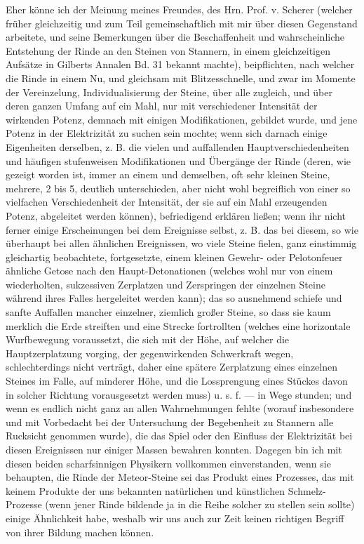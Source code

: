\documentclass[a4paper, 11pt, oneside, german]{article}
\begin{document}
{Eher könne ich der Meinung meines Freundes, des Hrn. Prof. v. Scherer (welcher früher gleichzeitig und zum Teil gemeinschaftlich mit mir über diesen Gegenstand arbeitete, und seine Bemerkungen über die Beschaffenheit und wahrscheinliche Entstehung der Rinde an den Steinen von Stannern, in einem gleichzeitigen Aufsätze in Gilberts Annalen Bd. 31 bekannt machte), beipflichten, nach welcher die Rinde in einem Nu, und gleichsam mit Blitzesschnelle, und zwar im Momente der Vereinzelung, Individualisierung der Steine, über alle zugleich, und über deren ganzen Umfang auf ein Mahl, nur mit verschiedener Intensität der wirkenden Potenz, demnach mit einigen Modifikationen, gebildet wurde, und jene Potenz in der Elektrizität zu suchen sein mochte; wenn sich darnach einige Eigenheiten derselben, z. B. die vielen und auffallenden Hauptverschiedenheiten und häufigen stufenweisen Modifikationen und Übergänge der Rinde (deren, wie gezeigt worden ist, immer an einem und demselben, oft sehr kleinen Steine, mehrere, 2 bis 5, deutlich unterschieden, aber nicht wohl begreiflich von einer so vielfachen Verschiedenheit der Intensität, der sie auf ein Mahl erzeugenden Potenz, abgeleitet werden können), befriedigend erklären ließen; wenn ihr nicht ferner einige Erscheinungen bei dem Ereignisse selbst, z. B. das bei diesem, so wie überhaupt bei allen ähnlichen Ereignissen, wo viele Steine fielen, ganz einstimmig gleichartig beobachtete, fortgesetzte, einem kleinen Gewehr- oder Pelotonfeuer ähnliche Getose nach den Haupt-Detonationen (welches wohl nur von einem wiederholten, sukzessiven Zerplatzen und Zerspringen der einzelnen Steine während ihres Falles hergeleitet werden kann); das so ausnehmend schiefe und sanfte Auffallen mancher einzelner, ziemlich großer Steine, so dass sie kaum merklich die Erde streiften und eine Strecke fortrollten (welches eine horizontale Wurfbewegung voraussetzt, die sich mit der Höhe, auf welcher die Hauptzerplatzung vorging, der gegenwirkenden Schwerkraft wegen, schlechterdings nicht verträgt, daher eine spätere Zerplatzung eines einzelnen Steines im Falle, auf minderer Höhe, und die Lossprengung eines Stückes davon in solcher Richtung vorausgesetzt werden muss) u. s. f. --- in Wege stunden; und wenn es endlich nicht ganz an allen Wahrnehmungen fehlte (worauf insbesondere und mit Vorbedacht bei der Untersuchung der Begebenheit zu Stannern alle Rucksicht genommen wurde), die das Spiel oder den Einfluss der Elektrizität bei diesen Ereignissen nur einiger Massen bewahren konnten. Dagegen bin ich mit diesen beiden scharfsinnigen Physikern vollkommen einverstanden, wenn sie behaupten, die Rinde der Meteor-Steine sei das Produkt eines Prozesses, das mit keinem Produkte der uns bekannten natürlichen und künstlichen Schmelz-Prozesse (wenn jener Rinde bildende ja in die Reihe solcher zu stellen sein sollte) einige Ähnlichkeit habe, weshalb wir uns auch zur Zeit keinen richtigen Begriff von ihrer Bildung machen können.}
\clearpage
\end{document}
